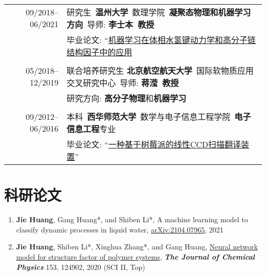 \documentclass[a4paper,10pt]{article} %
\begin{document}
\begin{tabular}{r|l}	

09/2018--06/2021 				    &研究生\ \textbf{温州大学}\ 数理学院\  \textbf{凝聚态物理和机器学习方向}\ 导师: \textbf{李士本\ 教授}\\
                                    & 毕业论文: “\href{https://nbviewer.jupyter.org/github/HuangJiaLian/DataBase0/blob/master/uPic/2021_07_24_12_HuangJieBiYeDaBian.pdf}{机器学习在体相水氢键动力学和高分子链结构因子中的应用} \\

\multicolumn{2}{c}{} \\	%

05/2018--12/2019            & 联合培养研究生 \textbf{北京航空航天大学}\ 国际软物质应用交叉研究中心\ 导师: \textbf{蒋滢\ 教授}  \\	
& 研究方向: \textbf{高分子物理}和\textbf{机器学习}\\

\multicolumn{2}{c}{} \\	%

09/2012--06/2016                    & 本科\ \textbf{西华师范大学}\ 数学与电子信息工程学院\ \textbf{电子信息工程}专业 \\
					 & 毕业论文: “\href{https://nbviewer.jupyter.org/github/HuangJiaLian/DataBase0/blob/master/uPic/2021_07_24_13_CCD_translation_device.pdf}{一种基于树莓派的线性CCD扫描翻译装置}”
\end{tabular}

\section{科研论文}  
\begin{small}
	\begin{enumerate}
		\item \textbf{Jie Huang}, Gang Huang*, and Shiben Li*, A machine learning model to classify dynamic processes in liquid water,   \href{https://arxiv.org/abs/2104.07965}{arXiv:2104.07965}, 2021
		
		\item \textbf{Jie Huang}, Shiben Li*, Xinghua Zhang*, and Gang Huang, \href{https://aip.scitation.org/doi/10.1063/5.0022464}{Neural network model for structure factor of polymer systems},  \textbf{\emph{The Journal of Chemical Physics}} 153, 124902, 2020 (SCI II, Top)
	\end{enumerate}
\end{small}
\end{document}

